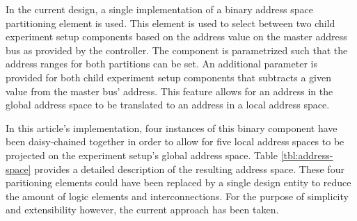 \documentclass{article}
\begin{document}
In the current design, a single implementation of a binary address space partitioning element is used. This element is used to select between two child experiment setup components based on the address value on the master address bus as provided by the controller. The component is parametrized such that the address ranges for both partitions can be set. An additional parameter is provided for both child experiment setup components that subtracts a given value from the master bus' address. This feature allows for an address in the global address space to be translated to an address in a local address space. 

In this article's implementation, four instances of this binary component have been daisy-chained together in order to allow for five local address spaces to be projected on the experiment setup's global address space. Table \ref{tbl:address-space} provides a detailed description of the resulting address space. These four paritioning elements could have been replaced by a single design entity to reduce the amount of logic elements and interconnections. For the purpose of simplicity and extensibility however, the current approach has been taken. 
\end{document}
